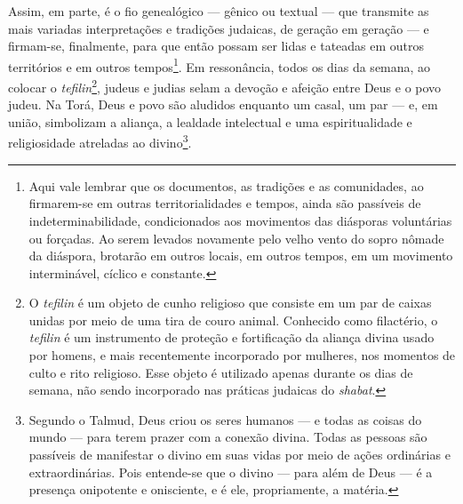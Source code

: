 Assim, em parte, é o fio genealógico --- gênico ou textual --- que
transmite as mais variadas interpretações e tradições judaicas, de
geração em geração --- e firmam-se, finalmente, para que então possam
ser lidas e tateadas em outros territórios e em outros
tempos\footnote{Aqui vale lembrar que os documentos, as tradições e as
  comunidades, ao firmarem-se em outras territorialidades e tempos,
  ainda são passíveis de indeterminabilidade, condicionados aos
  movimentos das diásporas voluntárias ou forçadas. Ao serem levados
  novamente pelo velho vento do sopro nômade da diáspora, brotarão em
  outros locais, em outros tempos, em um movimento interminável, cíclico
  e constante.}. Em ressonância, todos os dias da semana, ao colocar o
\emph{tefilin}\footnote{O \emph{tefilin} é um objeto de cunho religioso
  que consiste em um par de caixas unidas por meio de uma tira de couro
  animal. Conhecido como filactério, o \emph{tefilin} é um instrumento
  de proteção e fortificação da aliança divina usado por homens, e mais
  recentemente incorporado por mulheres, nos momentos de culto e rito
  religioso. Esse objeto é utilizado apenas durante os dias de semana,
  não sendo incorporado nas práticas judaicas do \emph{shabat}.}, judeus
e judias selam a devoção e afeição entre Deus e o povo judeu. Na
Torá, Deus e povo são aludidos enquanto um casal, um par --- e,
em união, simbolizam a aliança, a lealdade intelectual e uma
espiritualidade e religiosidade atreladas ao divino\footnote{Segundo o
  Talmud, Deus criou os seres humanos --- e todas as coisas do
  mundo --- para terem prazer com a conexão divina. Todas as pessoas são
  passíveis de manifestar o divino em suas vidas por meio de ações
  ordinárias e extraordinárias. Pois entende-se que o divino --- para
  além de Deus --- é a presença onipotente e onisciente, e é ele,
  propriamente, a matéria.}.

